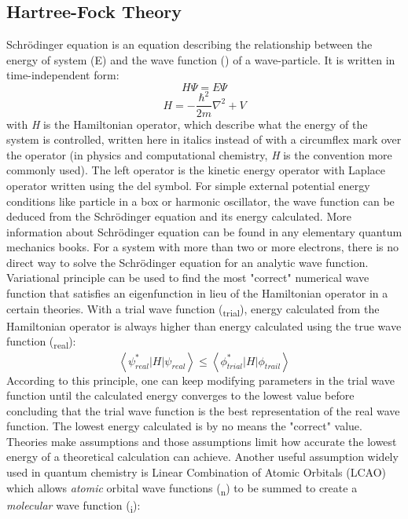 \documentclass[
journal=jpcbfk, %
manuscript=article]{achemso}
\begin{document}
	\subsection{Hartree-Fock Theory}
	Schr\"odinger equation is an equation describing the relationship between the energy of system (E) and the wave function (\textPsi) of a wave-particle. It is written in time-independent form:
	\begin{equation}
	\label{eq:schro1}
	H\Psi=E\Psi
	\end{equation}
	\begin{equation}
	\label{eq:schro2}
	H = -\frac{\hbar^{2}}{2m}\nabla^{2}+V
	\end{equation}
	with \textit{H} is the Hamiltonian operator, which describe what the energy of the system is controlled, written here in italics instead of with a circumflex mark over the operator (in physics and computational chemistry, \textit{H} is the convention more commonly used). The left operator is the kinetic energy operator with Laplace operator written using the del symbol. For simple external potential energy conditions like particle in a box or harmonic oscillator, the wave function can be deduced from the Schr\"odinger equation and its energy calculated. More information about Schr\"odinger equation can be found in any elementary quantum mechanics books.\cite{Eisberg1985,Griffiths2005} For a system with more than two or more electrons, there is no direct way to solve the Schr\"odinger equation for an analytic wave function. Variational principle can be used to find the most "correct" numerical wave function that satisfies an eigenfunction in lieu of the Hamiltonian operator in a certain theories. With a trial wave function (\textit{\straightphi}\textsubscript{trial}), energy calculated from the Hamiltonian operator is always higher than energy calculated using the true wave function (\textit{\textpsi}\textsubscript{real}): 
	\begin{equation}
	\label{eq:LCAO1}
	\left \langle \psi_{real}^{*} | H | \psi_{real}  \right \rangle \leq \left \langle \phi_{trial}^{*} | H | \phi_{trail}  \right \rangle 
	\end{equation}
	According to this principle, one can keep modifying parameters in the trial wave function until the calculated energy converges to the lowest value before concluding that the trial wave function is the best representation of the real wave function. The lowest energy calculated is by no means the "correct" value. Theories make assumptions and those assumptions limit how accurate the lowest energy of a theoretical calculation can achieve. Another useful assumption widely used in quantum chemistry is Linear Combination of Atomic Orbitals (LCAO) which allows \textit{atomic} orbital wave functions (\textchi\textsubscript{n}) to be summed to create a \textit{molecular} wave function (\textit{\straightphi}\textsubscript{i}):
\end{document}
